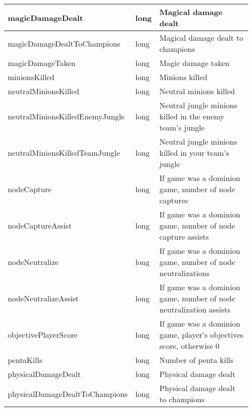 \begin{table}[!h]
\begin{tabular}{llp{5cm}}
magicDamageDealt                & long               & Magical damage dealt                                                            \\ \hline
magicDamageDealtToChampions     & long               & Magical damage dealt to champions                                               \\ \hline
magicDamageTaken                & long               & Magic damage taken                                                              \\ \hline
minionsKilled                   & long               & Minions killed                                                                  \\ \hline
neutralMinionsKilled            & long               & Neutral minions killed                                                          \\ \hline
neutralMinionsKilledEnemyJungle & long               & Neutral jungle minions killed in the enemy team's jungle                        \\ \hline
neutralMinionsKilledTeamJungle  & long               & Neutral jungle minions killed in your team's jungle                             \\ \hline
nodeCapture                     & long               & If game was a dominion game, number of node captures                            \\ \hline
nodeCaptureAssist               & long               & If game was a dominion game, number of node capture assists                     \\ \hline
nodeNeutralize                  & long               & If game was a dominion game, number of node neutralizations                     \\ \hline
nodeNeutralizeAssist            & long               & If game was a dominion game, number of node neutralization assists              \\ \hline
objectivePlayerScore            & long               & If game was a dominion game, player's objectives score, otherwise 0             \\ \hline
pentaKills                      & long               & Number of penta kills                                                           \\ \hline
physicalDamageDealt             & long               & Physical damage dealt                                                           \\ \hline
physicalDamageDealtToChampions  & long               & Physical damage dealt to champions                                              \\ \hline

\end{tabular}
\end{table}
